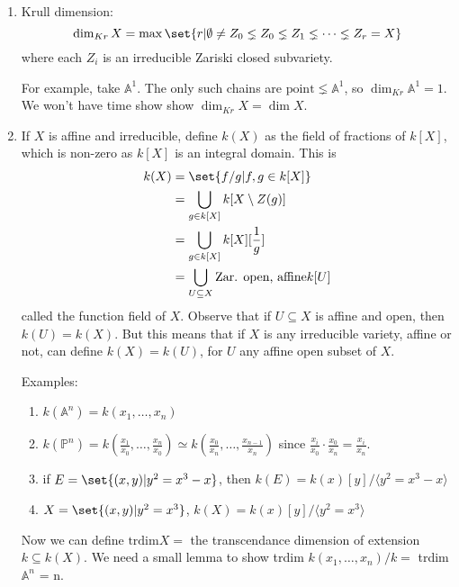 \documentclass{article}
\newcommand{\A}{\mathbb{A}}
\newcommand{\proj}{\mathbb{P}}
\begin{document}
\begin{enumerate}[label=(\arabic*)]
    \item Krull dimension:
        \begin{equation*}
            \dim_{Kr} X = \max\set{r | \emptyset \neq Z_0 \lneq Z_0 \lneq Z_1 \lneq \dotsb \lneq Z_r = X}
        \end{equation*}
        where each $Z_i$ is an irreducible Zariski closed subvariety.

        For example, take $\A^1$. The only such chains are $\text{point} \lneq \A^1$, so $\dim_{Kr} \A^1 = 1$.
        We won't have time show show $\dim_{Kr} X = \dim X$.
    \item If $X$ is affine and irreducible, define $k(X)$ as the field of fractions of $k[X]$, which is non-zero as $k[X]$ is an integral domain.
        This is
        \begin{align*}
            k(X) &= \set{f/g | f, g \in k[X]} \\
                 &= \bigcup_{g \in k[X]} k[X \setminus Z(g)] \\
                 &= \bigcup_{g \in k[X]} k[X][\frac{1}{g}] \\
                 &= \bigcup_{U \subseteq X} \text{Zar. open, affine} k[U]
        \end{align*}
        called the function field of $X$.
        Observe that if $U \subseteq X$ is affine and open, then $k(U) = k(X)$.
        But this means that if $X$ is any irreducible variety, affine or not, can define $k(X) = k(U)$, for $U$ any affine open subset of $X$.

        Examples:
        \begin{enumerate}[label=(\roman*)]
            \item $k(\A^n) = k(x_1, \dotsc, x_n)$
            \item $k(\proj^n) = k(\frac{x_1}{x_0}, \dotsc, \frac{x_n}{x_0}) \simeq k(\frac{x_0}{x_n}, \dotsc, \frac{x_{n-1}}{x_n})$ since $\frac{x_i}{x_0} \cdot \frac{x_0}{x_n} = \frac{x_i}{x_n}$.
            \item if $E = \set{(x, y) | y^2 = x^3 - x}$, then $k(E) = k(x)[y]/\langle y^2 = x^3 - x \rangle$
            \item $X = \set{(x, y) | y^2 = x^3}$, $k(X) = k(x)[y] / \langle y^2 = x^3 \rangle$
        \end{enumerate}

        Now we can define $\text{trdim} X =$ the transcendance dimension of extension $k \subseteq k(X)$.
        We need a small lemma to show trdim $k(x_1, \dotsc, x_n)/k = $ trdim $\A^n$ = n.
\end{enumerate}
\end{document}
